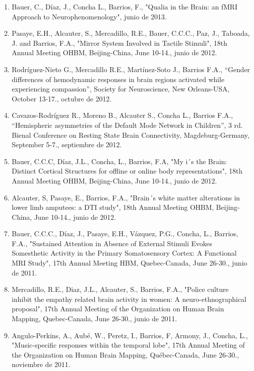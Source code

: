 \begin{enumerate}
\item  Bauer, C., Díaz, J., Concha L., Barrios, F., "Qualia in the Brain: an fMRI Approach to Neurophenomenology", junio de 2013.

\item  Pasaye, E.H., Alcauter, S., Mercadillo, R.E., Bauer, C.C.C., Paz, J., Taboada, J. and Barrios, F.A., "Mirror System 
Involved in Tactile Stimuli", 18th Annual Meeting OHBM, Beijing-China, June 10-14., 
junio de 2012.

\item  Rodríguez-Nieto G., Mercadillo R.E., Martínez-Soto J., Barrios F.A., “Gender differences of hemodynamic responses in 
brain regions activated while experiencing compassion”, Society for Neuroscience, New Orleans-USA, October 13-17., octubre de 
2012.

\item  Cavazos-Rodríguez R., Moreno B., Alcauter S., Concha L., Barrios F.A., “Hemispheric asymmetries of the Default Mode 
Network in Children”, 3 rd. Bienal Conference on Resting State Brain Connectivity, Magdeburg-Germany, September 5-7., 
septiembre de 2012.

\item  Bauer, C.C.C, Díaz, J.L., Concha, L., Barrios, F.A, "My i´s the Brain: Distinct Cortical Structures for offline or 
online 
body representations", 18th Annual Meeting OHBM, Beijing-China, June 10-14., junio de 
2012.

\item  Alcauter, S, Pasaye, E., Barrios, F.A., "Brain´s white matter alterations in lower limb amputees: a DTI study", 18th 
Annual Meeting OHBM, Beijing-China, June 10-14., junio de 2012.

\item  Bauer, C.C.C., Díaz, J., Pasaye, E.H., Vázquez, P.G., Concha, L., Barrios, F.A., "Sustained Attention in Absence of 
External Stimuli Evokes Somesthetic Activity in the Primary Somatosensory
Cortex: A Functional MRI Study", 17th Annual Meeting HBM, Quebec-Canada, June 26-30.,  
junio de 2011.

\item  Mercadillo, R.E., Diaz, J.L., Alcauter, S., Barrios, F.A., "Police culture inhibit the empathy related brain activity 
in 
women: A neuro-ethnographical proposal", 17th Annual Meeting of the Organization on Human Brain Mapping, Quebec-Canada, June 
26-30., junio de 2011.

\item  Angulo-Perkins, A., Aubé, W., Peretz, I., Barrios, F, Armony, J., Concha, L., "Music-specific responses within the 
temporal lobe", 17th Annual Meeting of the Organization on Human Brain Mapping, Québec-Canada, June 26-30., noviembre de 2011.


\end{enumerate}
